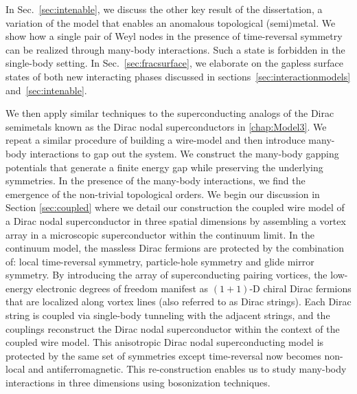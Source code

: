 In Sec.~\ref{sec:intenable}, we discuss the other key result of the dissertation, a variation of the model that enables an anomalous topological (semi)metal. We show how a single pair of Weyl nodes in the presence of time-reversal symmetry can be realized through many-body interactions. Such a state is forbidden in the single-body setting. In Sec.~\ref{sec:fracsurface}, we elaborate on the gapless surface states of both new interacting phases discussed in sections~\ref{sec:interactionmodels} and~\ref{sec:intenable}.

We then apply similar techniques to the superconducting analogs of the Dirac semimetals known as the Dirac nodal superconductors in \ref{chap:Model3}. We repeat a similar procedure of building a wire-model and then introduce many-body interactions to gap out the system. 
We construct the many-body gapping potentials that generate a finite energy gap while preserving the underlying symmetries. In the presence of the many-body interactions, we find the emergence of the non-trivial topological orders.
We begin our discussion in Section \ref{sec:coupled} where we detail our construction the coupled wire model of a Dirac nodal superconductor in three spatial dimensions by assembling a vortex array in a microscopic superconductor within the continuum limit. In the continuum model, the massless Dirac fermions are protected by the combination of: local time-reversal symmetry, particle-hole symmetry and glide mirror symmetry. By introducing the array of superconducting pairing vortices, the low-energy electronic degrees of freedom manifest as $(1+1)$-D chiral Dirac fermions that are localized along vortex lines (also referred to as Dirac strings).  Each Dirac string is coupled via single-body tunneling with the adjacent strings, and the couplings reconstruct the Dirac nodal superconductor within the context of the coupled wire model. This anisotropic Dirac nodal superconducting model is protected by the same set of symmetries except time-reversal now becomes non-local and antiferromagnetic. This re-construction enables us to study many-body interactions in three dimensions using bosonization techniques.

